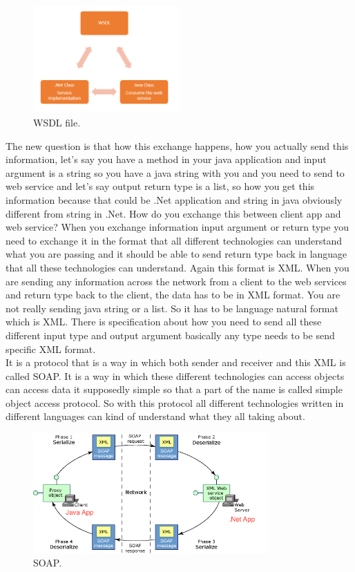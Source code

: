 \begin{figure}[!htb]
  \centering
  \includegraphics[width=0.5\textwidth]{Figures/WSDL.png}
  \caption[WSDL file.]{WSDL file.}
  \label{fig:wsdl}
\end{figure}

The new question is that how this exchange happens, how you actually send this information, let’s say you have a method in
your java application and input argument is a string so you have a java string with you and you need to send to web service
and let’s say output return type is a list, so how you get this information because that could be .Net application and string
in java obviously different from string in .Net. How do you exchange this between client app and web service?  When you exchange
information input argument or return type you need to exchange it in the format that all different technologies can understand
what you are passing and it should be able to send return type back in language that all these technologies can understand.
Again this format is XML. When you are sending any information across the network from a client to the web services and
return type back to the client, the data has to be in XML format. You are not really sending java string or a list. So it
has to be language natural format which is XML. There is specification about how you need to send all these different input
type and output argument basically any type needs to be send specific XML format.\\

It is a protocol that is a way in which both sender and receiver and this XML is called SOAP.
It is a way in which these different technologies can access objects can access data it supposedly simple so that a part
of the name is called simple object access protocol. So with this protocol all different technologies written in different
languages can kind of understand what they all taking about.\\

\begin{figure}[!htb]
  \centering
  \includegraphics[width=0.8\textwidth]{Figures/soap.png}
  \caption[SOAP.]{SOAP.}
  \label{fig:wsdl}
\end{figure}

